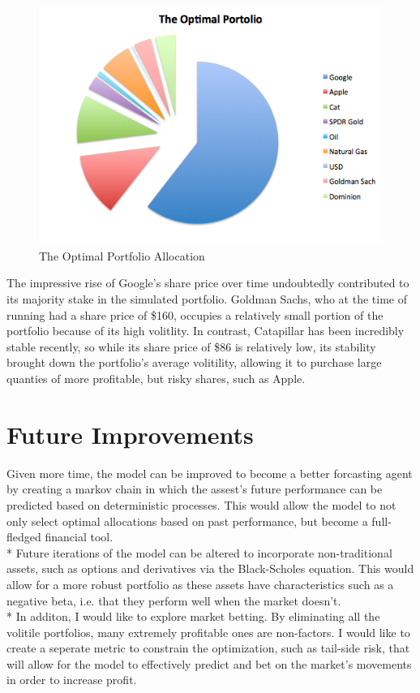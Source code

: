\documentclass[12pt]{article}
\begin{document}
\begin{figure}[!h]
\begin{center}
\includegraphics[scale=.5]{Figures/OptimalPort.png}
\caption{The Optimal Portfolio Allocation}
\end{center}
\end{figure}


The impressive rise of Google's share price over time undoubtedly contributed to its majority stake in the simulated portfolio. Goldman Sachs, who at the time of running had a share price of \$160, occupies a relatively small portion of the portfolio because of its high volitlity. In contrast, Catapillar has been incredibly stable recently, so while its share price of \$86 is relatively low, its stability brought down the portfolio's average volitility, allowing it to purchase large quanties of more profitable, but risky shares, such as Apple.

\section{Future Improvements}
Given more time, the model can be improved to become a better forcasting agent by creating a markov chain in which the assest's future performance can be predicted based on deterministic processes. This would allow the model to not only select optimal allocations based on past performance, but become a full-fledged financial tool. \\*
Future iterations of the model can be altered to incorporate non-traditional assets, such as options and derivatives via the Black-Scholes equation. This would allow for a more robust portfolio as these assets have characteristics such as a negative beta, i.e. that they perform well when the market doesn't. \\*
In additon, I would like to explore market betting. By eliminating all the volitile portfolios, many extremely profitable ones are non-factors. I would like to create a seperate metric to constrain the optimization, such as tail-side risk, that will allow for the model to effectively predict and bet on the market's movements in order to increase profit. 

\newpage
\end{document}
